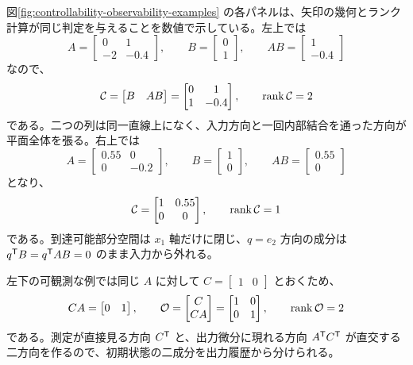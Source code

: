 図\ref{fig:controllability-observability-examples} の各パネルは、矢印の幾何とランク計算が同じ判定を与えることを数値で示している。左上では
\begin{equation}
  A=\begin{bmatrix}0&1\\-2&-0.4\end{bmatrix},\qquad
  B=\begin{bmatrix}0\\1\end{bmatrix},\qquad
  AB=\begin{bmatrix}1\\-0.4\end{bmatrix}
\end{equation}
なので、
\begin{equation}
  \mathcal{C}=\begin{bmatrix}B&AB\end{bmatrix}
  =\begin{bmatrix}0&1\\1&-0.4\end{bmatrix},\qquad
  \operatorname{rank}\mathcal{C}=2
\end{equation}
である。二つの列は同一直線上になく、入力方向と一回内部結合を通った方向が平面全体を張る。右上では
\begin{equation}
  A=\begin{bmatrix}0.55&0\\0&-0.2\end{bmatrix},\qquad
  B=\begin{bmatrix}1\\0\end{bmatrix},\qquad
  AB=\begin{bmatrix}0.55\\0\end{bmatrix}
\end{equation}
となり、
\begin{equation}
  \mathcal{C}
  =\begin{bmatrix}1&0.55\\0&0\end{bmatrix},\qquad
  \operatorname{rank}\mathcal{C}=1
\end{equation}
である。到達可能部分空間は $x_1$ 軸だけに閉じ、$q=e_2$ 方向の成分は $q^{\mathsf{T}} B=q^{\mathsf{T}} AB=0$ のまま入力から外れる。

左下の可観測な例では同じ $A$ に対して $C=\begin{bmatrix}1&0\end{bmatrix}$ とおくため、
\begin{equation}
  CA=\begin{bmatrix}0&1\end{bmatrix},\qquad
  \mathcal{O}=\begin{bmatrix}C\\CA\end{bmatrix}
  =\begin{bmatrix}1&0\\0&1\end{bmatrix},\qquad
  \operatorname{rank}\mathcal{O}=2
\end{equation}
である。測定が直接見る方向 $C^{\mathsf{T}}$ と、出力微分に現れる方向 $A^{\mathsf{T}} C^{\mathsf{T}}$ が直交する二方向を作るので、初期状態の二成分を出力履歴から分けられる。

